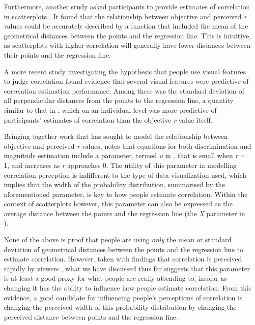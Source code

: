 \documentclass[preprint, 3p,
authoryear]{elsarticle} %
\begin{document}
Furthermore, another study asked participants to provide estimates of
correlation in scatterplots \citep{meyer_1997}. It found that the
relationship between objective and perceived \emph{r} values could be
accurately described by a function that included the mean of the
geometrical distances between the points and the regression line. This
is intuitive, as scatterplots with higher correlation will generally
have lower distances between their points and the regression line.

A more recent study investigating the hypothesis that people use visual
features to judge correlation \citep{yang_2019} found evidence that
several visual features were predictive of correlation estimation
performance. Among these was the standard deviation of all perpendicular
distances from the points to the regression line, a quantity similar to
that in \citet{meyer_1997}, which on an individual level was more
predictive of participants' estimates of correlation than the objective
\emph{r} value itself.

Bringing together work that has sought to model the relationship between
objective and perceived \emph{r} values, \citet{rensink_2017} notes that
equations for both discrimination and magnitude estimation include a
parameter, termed \emph{u} in \citet{rensink_2017}, that is small when
\emph{r} = 1, and increases as \emph{r} approaches 0. The utility of
this parameter in modelling correlation perception is indifferent to the
type of data visualization used, which implies that the width of the
probability distribution, summarised by the aforementioned parameter, is
key to how people estimate correlation. Within the context of
scatterplots however, this parameter can also be expressed as the
average distance between the points and the regression line (the
\emph{X} parameter in \citep{meyer_1997}).

None of the above is proof that people are using \emph{only} the mean or
standard deviation of geometrical distances between the points and the
regression line to estimate correlation. However, taken with findings
that correlation is perceived rapidly by viewers \citep{rensink_2014},
what we have discussed thus far suggests that this parameter is at least
a good proxy for what people are really attending to, insofar as
changing it has the ability to influence how people estimate
correlation. From this evidence, a good candidate for influencing
people's perceptions of correlation is changing the perceived width of
this probability distribution by changing the perceived distance between
points and the regression line.
\end{document}
